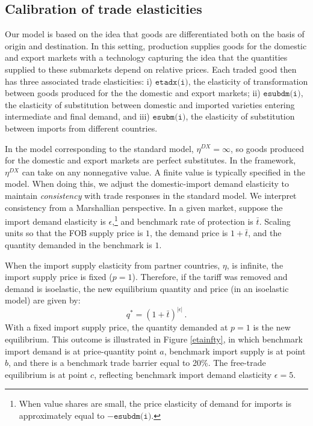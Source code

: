\subsection{Calibration of trade elasticities}\label{app:thetadx}

Our \SOE model is based on the idea that goods are differentiated both on the basis of origin and destination.
In this setting, production supplies goods for the domestic and export markets with a technology capturing the idea that the quantities supplied to these submarkets depend on relative prices.
Each traded good then has three associated trade elasticities: i) $\texttt{etadx(i)}$, the elasticity of transformation between goods produced for the the domestic and export markets; ii) $\texttt{esubdm(i)}$, the elasticity of substitution between domestic and imported varieties entering intermediate and final demand, and iii) $\texttt{esubm(i)}$, the elasticity of substitution between imports from different countries.

In the \GMR model corresponding to the standard \GTAP model, $\eta^{DX} = \infty$, so goods produced for the domestic and export markets are perfect substitutes.
In the \GTAPINGAMS framework, $\eta^{DX}$ can take on any nonnegative value.
A finite value is typically specified in the \SOE model.
When doing this, we adjust the domestic-import demand elasticity to maintain \textit{consistency} with trade responses in the standard \GTAP model.
We interpret consistency from a Marshallian perspective.
In a given market, suppose the import demand elasticity is $\epsilon$,\footnote{When value shares are small, the price elasticity of demand for imports is approximately equal to $-\texttt{esubdm(i)}$.} and benchmark rate of protection is $\bar t$.
Scaling units so that the FOB supply price is $1$, the demand price is $1+\bar t$, and the quantity demanded in the benchmark is $1$.

When the import supply elasticity from partner countries, $\eta$, is infinite, the import supply price is fixed ($p=1$).
Therefore, if the tariff was removed and demand is isoelastic, the new equilibrium quantity and price (in an isoelastic model) are given by:
\begin{equation}
\label{newqty}
q^* = \left(1 + \bar t \right)^{|\epsilon|}\,.
\end{equation}
With a fixed import supply price, the quantity demanded at $p=1$ is the new equilibrium.
This outcome is illustrated in Figure \ref{etainfty}, in which benchmark import demand is at price-quantity point $a$, benchmark import supply is at point $b$, and there is a benchmark trade barrier equal to 20\%.
The free-trade equilibrium is at point $c$, reflecting benchmark import demand elasticity $\epsilon = 5$.

